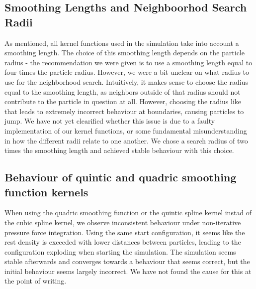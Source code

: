 \documentclass{ACGSeminar}
\begin{document}
\subsection{Smoothing Lengths and Neighboorhod Search Radii}
As mentioned, all kernel functions used in the simulation take into account a smoothing length. The choice of this smoothing length depends on the particle radius - the recommendation we were given is to use a smoothing length equal to four times the particle radius. However, we were a bit unclear on what radius to use for the neighborhood search. 
Intuitively, it makes sense to choose the radius equal to the smoothing length, as neighbors outside of that radius should not contribute to the particle in question at all. However, choosing the radius like that leads to extremely incorrect behaviour at boundaries, causing particles to jump. We have not yet clearified whether this issue is due to a faulty implementation of our kernel functions, or some fundamental misunderstanding in how the different radii relate to one another. We chose a search radius of two times the smoothing length and achieved stable behaviour with this choice.

\subsection{Behaviour of quintic and quadric smoothing function kernels}

When using the quadric smoothing function or the quintic spline kernel instad of the cubic spline kernel, we observe inconsistent behaviour under non-iterative pressure force integration. Using the same start configuration, it seems like the rest density is exceeded with lower distances between particles, leading to the configuration exploding when starting the simulation. The simulation seems stable afterwards and converges towards a behaviour that seems correct, but the initial behaviour seems largely incorrect. We have not found the cause for this at the point of writing.  ~\cite{article}




\printbibliography
\cleardoublepage
\end{document}
